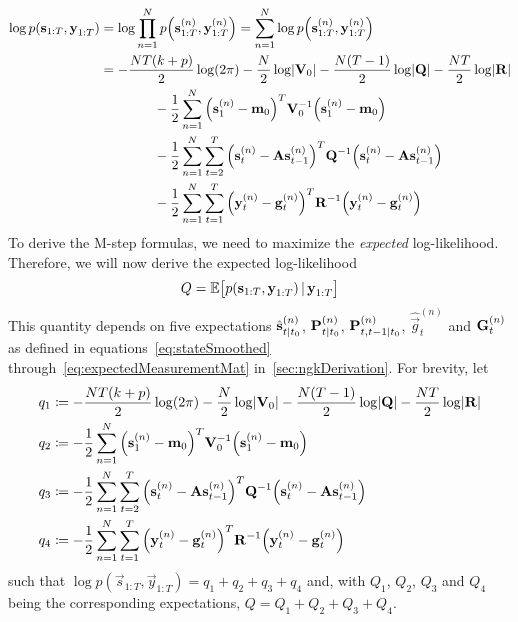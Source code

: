		\begin{align*}
			\log p(\boldsymbol{\mathrm{s}}_{1:T}, \boldsymbol{\mathrm{y}}_{1:T})
				&= \log \prod_{n = 1}^{N} p\Big(\boldsymbol{\mathrm{s}}_{1:T}^{(n)}, \boldsymbol{\mathrm{y}}_{1:T}^{(n)}\Big) = \sum_{n = 1}^{N} \log p\Big(\boldsymbol{\mathrm{s}}_{1:T}^{(n)}, \boldsymbol{\mathrm{y}}_{1:T}^{(n)}\Big) \\
				&= -\frac{NT(k + p)}{2} \log(2\pi) - \frac{N}{2} \log \lvert \boldsymbol{\mathrm{V}}_0 \rvert - \frac{N(T - 1)}{2} \log \lvert \boldsymbol{\mathrm{Q}} \rvert - \frac{NT}{2} \log \lvert \boldsymbol{\mathrm{R}} \rvert \\
				&\qquad\qquad -\frac{1}{2} \sum_{n = 1}^{N} \Big( \boldsymbol{\mathrm{s}}_1^{(n)} - \boldsymbol{\mathrm{m}}_0 \Big)^T \boldsymbol{\mathrm{V}}_0^{-1} \Big( \boldsymbol{\mathrm{s}}_1^{(n)} - \boldsymbol{\mathrm{m}}_0 \Big) \\
				&\qquad\qquad -\frac{1}{2} \sum_{n = 1}^{N} \sum_{t = 2}^{T} \Big( \boldsymbol{\mathrm{s}}_t^{(n)} - \boldsymbol{\mathrm{A}} \boldsymbol{\mathrm{s}}_{t - 1}^{(n)} \Big)^T \boldsymbol{\mathrm{Q}}^{-1} \Big( \boldsymbol{\mathrm{s}}_t^{(n)} - \boldsymbol{\mathrm{A}} \boldsymbol{\mathrm{s}}_{t - 1}^{(n)} \Big) \\
				&\qquad\qquad -\frac{1}{2} \sum_{n = 1}^{N} \sum_{t = 1}^{T} \Big( \boldsymbol{\mathrm{y}}_t^{(n)} - \boldsymbol{\mathrm{g}}_t^{(n)} \Big)^T \boldsymbol{\mathrm{R}}^{-1} \Big( \boldsymbol{\mathrm{y}}_t^{(n)} - \boldsymbol{\mathrm{g}}_t^{(n)} \Big)
		\end{align*}
		To derive the M-step formulas, we need to maximize the \emph{expected} log-likelihood. Therefore, we will now derive the expected log-likelihood
		\begin{equation*}
			Q = \mathbb{E}\big[ p(\boldsymbol{\mathrm{s}}_{1:T}, \boldsymbol{\mathrm{y}}_{1:T}) \,\vert\, \boldsymbol{\mathrm{y}}_{1:T} \big]
		\end{equation*}
		This quantity depends on five expectations \( \hat{\boldsymbol{\mathrm{s}}}_{t \vert t_0}^{(n)} \), \( \boldsymbol{\mathrm{P}}_{t \vert t_0}^{(n)} \), \( \boldsymbol{\mathrm{P}}_{t, t - 1 \vert t_0}^{(n)} \), \( \hat{\vec{g}}_t^{(n)} \) and \( \boldsymbol{\mathrm{G}}_{t}^{(n)} \) as defined in equations~\eqref{eq:stateSmoothed} through~\eqref{eq:expectedMeasurementMat} in~\autoref{sec:ngkDerivation}. For brevity, let
		\begin{align*}
			q_1 &\coloneqq -\frac{NT(k + p)}{2} \log(2\pi) - \frac{N}{2} \log \lvert \boldsymbol{\mathrm{V}}_0 \rvert - \frac{N(T - 1)}{2} \log \lvert \boldsymbol{\mathrm{Q}} \rvert - \frac{NT}{2} \log \lvert \boldsymbol{\mathrm{R}} \rvert \\
			q_2 &\coloneqq -\frac{1}{2} \sum_{n = 1}^{N} \Big( \boldsymbol{\mathrm{s}}_1^{(n)} - \boldsymbol{\mathrm{m}}_0 \Big)^T \boldsymbol{\mathrm{V}}_0^{-1} \Big( \boldsymbol{\mathrm{s}}_1^{(n)} - \boldsymbol{\mathrm{m}}_0 \Big) \\
			q_3 &\coloneqq -\frac{1}{2} \sum_{n = 1}^{N} \sum_{t = 2}^{T} \Big( \boldsymbol{\mathrm{s}}_t^{(n)} - \boldsymbol{\mathrm{A}} \boldsymbol{\mathrm{s}}_{t - 1}^{(n)} \Big)^T \boldsymbol{\mathrm{Q}}^{-1} \Big( \boldsymbol{\mathrm{s}}_t^{(n)} - \boldsymbol{\mathrm{A}} \boldsymbol{\mathrm{s}}_{t - 1}^{(n)} \Big) \\
			q_4 &\coloneqq -\frac{1}{2} \sum_{n = 1}^{N} \sum_{t = 1}^{T} \Big( \boldsymbol{\mathrm{y}}_t^{(n)} - \boldsymbol{\mathrm{g}}_t^{(n)} \Big)^T \boldsymbol{\mathrm{R}}^{-1} \Big( \boldsymbol{\mathrm{y}}_t^{(n)} - \boldsymbol{\mathrm{g}}_t^{(n)} \Big)
		\end{align*}
		such that \( \log p(\vec{s}_{1:T}, \vec{y}_{1:T}) = q_1 + q_2 + q_3 + q_4 \) and, with \(Q_1\), \(Q_2\), \(Q_3\) and \(Q_4\) being the corresponding expectations, \( Q = Q_1 + Q_2 + Q_3 + Q_4 \).

